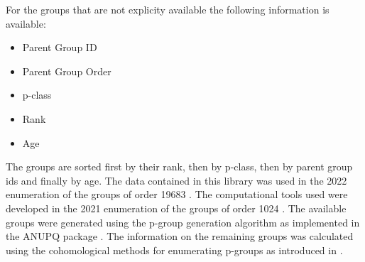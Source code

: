 \documentclass[a4paper,11pt]{report}
\begin{document}
{{ For the groups that are not explicity available the following information is
available: 

 
\begin{itemize}
\item  Parent Group ID 
\item  Parent Group Order 
\item  p-class 
\item  Rank 
\item  Age 
\end{itemize}
 

 The groups are sorted first by their rank, then by p-class, then by parent
group ids and finally by age. The data contained in this library was used in
the 2022 enumeration of the groups of order 19683 \cite{Burrell2022a}. The computational tools used were developed in the 2021 enumeration of the
groups of order 1024 \cite{Burrell2021a}. The available groups were generated using the p-group generation algorithm \cite{OBrien1990a} as implemented in the ANUPQ package \cite{Gamble2019a}. The information on the remaining groups was calculated using the
cohomological methods for enumerating p-groups as introduced in \cite{Eick1999a}. 

 }

 }

   
\end{document}
